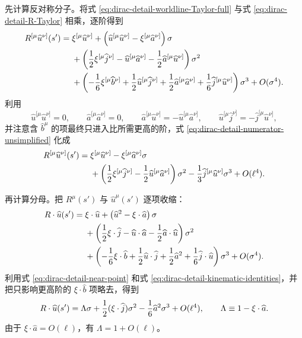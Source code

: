 先计算反对称分子。将式 \eqref{eq:dirac-detail-worldline-Taylor-full} 与式 \eqref{eq:dirac-detail-R-Taylor} 相乘，逐阶得到
\begin{align}
 R^{[\mu}\widehat u^{\nu]}(s')
 ={}&\xi^{[\mu}\widehat u^{\nu]}
 +\left(\widehat u^{[\mu}\widehat u^{\nu]}-\xi^{[\mu}\widehat a^{\nu]}\right)\sigma
 \notag\\
 &+\left({1\over2}\xi^{[\mu}\widehat j^{\nu]}
 -\widehat u^{[\mu}\widehat a^{\nu]}
 -{1\over2}\widehat a^{[\mu}\widehat u^{\nu]}\right)\sigma^2
 \notag\\
 &+\left(-{1\over6}\xi^{[\mu}\widehat b^{\nu]}
 +{1\over2}\widehat u^{[\mu}\widehat j^{\nu]}
 +{1\over2}\widehat a^{[\mu}\widehat a^{\nu]}
 +{1\over6}\widehat j^{[\mu}\widehat u^{\nu]}\right)\sigma^3
 +O(\sigma^4).
 \label{eq:dirac-detail-numerator-unsimplified}
\end{align}
利用
\begin{equation*}
 \widehat u^{[\mu}\widehat u^{\nu]}=0,
 \qquad
 \widehat a^{[\mu}\widehat a^{\nu]}=0,
 \qquad
 \widehat a^{[\mu}\widehat u^{\nu]}=-\widehat u^{[\mu}\widehat a^{\nu]},
 \qquad
 \widehat u^{[\mu}\widehat j^{\nu]}=-\widehat j^{[\mu}\widehat u^{\nu]},
\end{equation*}
并注意含 $\widehat b^\mu$ 的项最终只进入比所需更高的阶，式 \eqref{eq:dirac-detail-numerator-unsimplified} 化成
\begin{align}
 R^{[\mu}\widehat u^{\nu]}(s')
 ={}&\xi^{[\mu}\widehat u^{\nu]}
 -\xi^{[\mu}\widehat a^{\nu]}\sigma
 \notag\\
 &+\left({1\over2}\xi^{[\mu}\widehat j^{\nu]}
 -{1\over2}\widehat u^{[\mu}\widehat a^{\nu]}\right)\sigma^2
 -{1\over3}\widehat j^{[\mu}\widehat u^{\nu]}\sigma^3
 +O(\ell^4).
 \label{eq:dirac-detail-numerator-simplified}
\end{align}

再计算分母。把 $R^\mu(s')$ 与 $\widehat u^\mu(s')$ 逐项收缩：
\begin{align}
 R\cdot \widehat u(s')
 ={}&\xi\cdot \widehat u
 +\left(\widehat u^2-\xi\cdot \widehat a\right)\sigma
 \notag\\
 &+\left({1\over2}\xi\cdot \widehat j
 -\widehat u\cdot \widehat a-{1\over2}\widehat a\cdot \widehat u\right)\sigma^2
 \notag\\
 &+\left(-{1\over6}\xi\cdot \widehat b
 +{1\over2}\widehat u\cdot \widehat j
 +{1\over2}\widehat a^2
 +{1\over6}\widehat j\cdot \widehat u\right)\sigma^3
 +O(\sigma^4).
 \label{eq:dirac-detail-denominator-unsimplified}
\end{align}
利用式 \eqref{eq:dirac-detail-near-point} 和式 \eqref{eq:dirac-detail-kinematic-identities}，并把只影响更高阶的 $\xi\cdot \widehat b$ 项略去，得到
\begin{equation}
 R\cdot \widehat u(s')
 =\Lambda\sigma
 +{1\over2}(\xi\cdot \widehat j)\sigma^2
 -{1\over6}\widehat a^2\sigma^3
 +O(\ell^4),
 \qquad
 \Lambda\equiv1-\xi\cdot \widehat a.
 \label{eq:dirac-detail-denominator-simplified}
\end{equation}
由于 $\xi\cdot \widehat a=O(\ell)$，有 $\Lambda=1+O(\ell)$。

